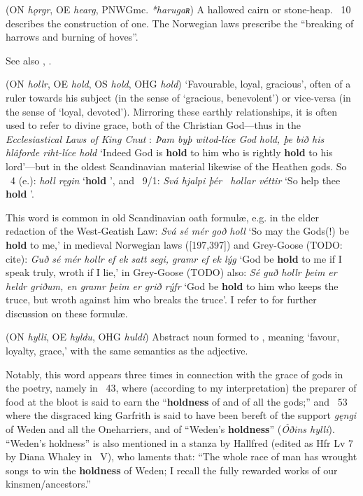 \begin{itemize}
 (ON \emph{hǫrgr}, OE \emph{hearg}, PNWGmc. \emph{*harugaʀ})
  A hallowed cairn or stone-heap.  \Hyndluljod\ 10 describes the construction of one.  The Norwegian laws prescribe the “breaking of harrows and burning of hoves”.

  See also , .

 (ON \emph{hollr}, OE \emph{hold}, OS \emph{hold}, OHG \emph{hold})
  ‘Favourable, loyal, gracious’, often of a ruler towards his subject (in the sense of ‘gracious, benevolent’) or vice-versa (in the sense of ‘loyal, devoted’).  Mirroring these earthly relationships, it is often used to refer to divine grace, both of the Christian God—thus in the \emph{Ecclesiastical Laws of King Cnut} : \emph{Þam byþ witod-líce God hold, þe bið his hlâforde riht-líce hold} ‘Indeed God is \textbf{hold} to him who is rightly \textbf{hold} to his lord’—but in the oldest Scandinavian material likewise of the Heathen gods.
  So \Lokasenna\ 4 (e.): \emph{holl ręgin} ‘\textbf{hold} ’, and \Oddrunargratr\ 9/1: \emph{Svá hjalpi þér \hld\ hollar véttir} ‘So help thee \textbf{hold} ’. %

  This word is common in old Scandinavian oath formulæ, e.g. in the elder redaction of the West-Geatish Law: \emph{Svá sé mér goð holl} ‘So may the Gods(!) be \textbf{hold} to me,’ in medieval Norwegian laws ([197,397]) and Grey-Goose (TODO: cite): \emph{Guð sé mér hollr ef ek satt segi, gramr ef ek lýg} ‘God be \textbf{hold} to me if I speak truly, wroth if I lie,’ in Grey-Goose (TODO) also: \emph{Sé guð hollr þeim er heldr griðum, en gramr þeim er grið rýfr} ‘God be \textbf{hold} to him who keeps the truce, but wroth against him who breaks the truce’. I refer to \textcite{Läffler1895} for further discussion on these formulæ.

 (ON \emph{hylli}, OE \emph{hyldu}, OHG \emph{huldí})
  Abstract noun formed to , meaning ‘favour, loyalty, grace,’ with the same semantics as the adjective.

  Notably, this word appears three times in connection with the grace of gods in the poetry, namely in \Grimnismal\ 43, where (according to my interpretation) the preparer of food at the bloot is said to earn the “\textbf{holdness} of  and of all the gods;” and \Grimnismal\ 53 where the disgraced king Garfrith is said to have been bereft of the support \emph{gęngi} of Weden and all the Oneharriers, and of “Weden’s \textbf{holdness}” (\emph{Óðins hylli}).  “Weden’s holdness” is also mentioned in a stanza by Hallfred (edited as Hfr Lv 7 by Diana Whaley in \Skp\ V), who laments that: “The whole race of man has wrought songs to win the \textbf{holdness} of Weden; I recall the fully rewarded works of our kinsmen/ancestors.”


\end{itemize}
